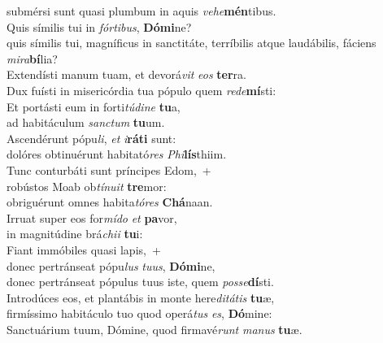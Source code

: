 \oddverse submérsi sunt quasi plumbum in aquis \textit{ve}\textit{he}\textbf{mén}tibus.\\
\evenverse Quis símilis tui in \textit{fór}\textit{ti}\textit{bus}, \textbf{Dó}\textbf{mi}ne?~\*\\
\evenverse quis símilis tui, magníficus in sanctitáte, terríbilis atque laudábilis, fáciens \textit{mi}\textit{ra}\textbf{bí}lia?\\
\oddverse Extendísti manum tuam, et devorá\textit{vit} \textit{e}\textit{os} \textbf{ter}ra.~\*\\
\oddverse Dux fuísti in misericórdia tua pópulo quem \textit{re}\textit{de}\textbf{mí}sti:\\
\evenverse Et portásti eum in forti\textit{tú}\textit{di}\textit{ne} \textbf{tu}a,~\*\\
\evenverse ad habitáculum \textit{san}\textit{ctum} \textbf{tu}um.\\
\oddverse Ascendérunt pópu\textit{li}, \textit{et} \textit{i}\textbf{rá}\textbf{ti} sunt:~\*\\
\oddverse dolóres obtinuérunt habitató\textit{res} \textit{Phi}\textbf{lís}thiim.\\
\evenverse Tunc conturbáti sunt príncipes Edom,~+\\
\evenverse  robústos Moab ob\textit{tí}\textit{nu}\textit{it} \textbf{tre}mor:~\*\\
\evenverse obriguérunt omnes habita\textit{tó}\textit{res} \textbf{Chá}naan.\\
\oddverse Irruat super eos for\textit{mí}\textit{do} \textit{et} \textbf{pa}vor,~\*\\
\oddverse in magnitúdine brá\textit{chi}\textit{i} \textbf{tu}i:\\
\evenverse Fiant immóbiles quasi lapis,~+\\
\evenverse  donec pertránseat pópu\textit{lus} \textit{tu}\textit{us}, \textbf{Dó}\textbf{mi}ne,~\*\\
\evenverse donec pertránseat pópulus tuus iste, quem \textit{pos}\textit{se}\textbf{dí}sti.\\
\oddverse Introdúces eos, et plantábis in monte here\textit{di}\textit{tá}\textit{tis} \textbf{tu}æ,~\*\\
\oddverse firmíssimo habitáculo tuo quod operá\textit{tus} \textit{es}, \textbf{Dó}mine:\\
\evenverse Sanctuárium tuum, Dómine, quod firmavé\textit{runt} \textit{ma}\textit{nus} \textbf{tu}æ.~\*\\
